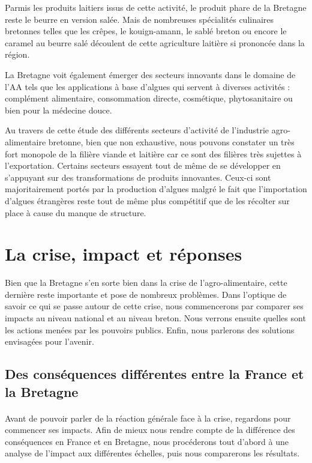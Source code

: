 \documentclass[a4paper,10pt]{report}
\begin{document}
			Parmis les produits laitiers issus de cette activité, le produit phare de la Bretagne reste le beurre en version salée. Mais de nombreuses spécialités culinaires bretonnes telles que les crêpes, le kouign-amann, le sablé breton ou encore le caramel au beurre salé découlent de cette agriculture laitière si prononcée dans la région.
			
			La Bretagne voit également émerger des secteurs innovants dans le domaine de l’AA tels que les applications à base d’algues qui servent à diverses activités\cite{CartesBretagneAgroAlimentaire20142016} : complément alimentaire, consommation directe, cosmétique, phytosanitaire ou bien pour la médecine douce.
			
			Au travers de cette étude des différents secteurs d’activité de l’industrie agro-alimentaire bretonne, bien que non exhaustive, nous pouvons constater un très fort monopole de la filière viande et laitière car ce sont des filières très sujettes à l’exportation. Certains secteurs essayent tout de même de se développer en s’appuyant sur des transformations de produits innovantes. Ceux-ci sont majoritairement portés par la production d’algues malgré le fait que l’importation d’algues étrangères reste tout de même plus compétitif que de les récolter sur place à cause du manque de structure.
			
			
	\section{La crise, impact et réponses}
		Bien que la Bretagne s’en sorte bien dans la crise de l’agro-alimentaire, cette dernière reste importante et pose de nombreux problèmes. Dans l’optique de savoir ce qui se passe autour de cette crise, nous commencerons par comparer ses impacts au niveau national et au niveau breton. Nous verrons ensuite quelles sont les actions menées par les pouvoirs publics. Enfin, nous parlerons des solutions envisagées pour l’avenir.
		
		\subsection{Des conséquences différentes entre la France et la Bretagne}
			\paragraph{}Avant de pouvoir parler de la réaction générale face à la crise, regardons pour commencer ses impacts. Afin de mieux nous rendre compte de la différence des conséquences en France et en Bretagne, nous procéderons tout d'abord à une analyse de l'impact aux différentes échelles, puis nous comparerons les résultats.
\end{document}
